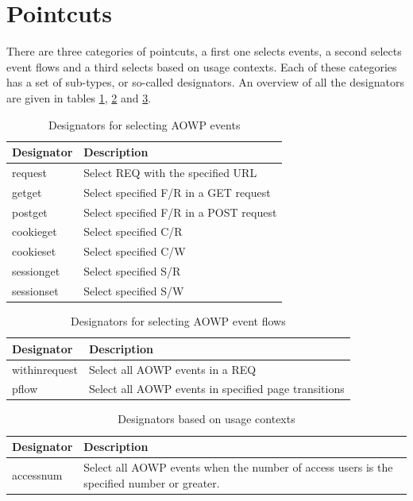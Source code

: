 \documentclass[a4paper]{report}
\begin{document}
\section{Pointcuts}
There are three categories of pointcuts, a first one selects events, a second selects event flows and a third selects based on usage contexts. Each of these categories has a set of sub-types, or so-called designators. An overview of all the designators are given in tables \ref{tab:Designators_AOWP_Events}, \ref{tab:Designators_AOWP_Flows} and \ref{tab:Designators_AOWP_Contexts}.
\begin{table}
\centering
\begin{tabular}{l|p{7cm}}
\hline
Designator & Description\\
\hline
\hline
request & Select REQ with the specified URL\\
\hline
getget & Select specified F/R in a GET request\\
\hline
postget & Select specified F/R in a POST request\\
\hline
cookieget & Select specified C/R\\
\hline
cookieset & Select specified C/W\\
\hline
sessionget & Select specified S/R\\
\hline
sessionset & Select specified S/W\\
\hline
\end{tabular}
\caption{Designators for selecting AOWP events}
\label{tab:Designators_AOWP_Events}
\end{table}
\begin{table}
\centering
\begin{tabular}{l|p{7cm}}
\hline
Designator & Description\\
\hline
\hline
withinrequest & Select all AOWP events in a REQ\\
\hline
pflow & Select all AOWP events in specified page transitions\\
\hline
\end{tabular}
\caption{Designators for selecting AOWP event flows}
\label{tab:Designators_AOWP_Flows}
\end{table}
\begin{table}
\centering
\begin{tabular}{l|p{7cm}}
\hline
Designator & Description\\
\hline
\hline
accessnum & Select all AOWP events when the number of access users is the specified number or greater.\\
\hline
\end{tabular}
\caption{Designators based on usage contexts}
\label{tab:Designators_AOWP_Contexts}
\end{table}
\end{document}
